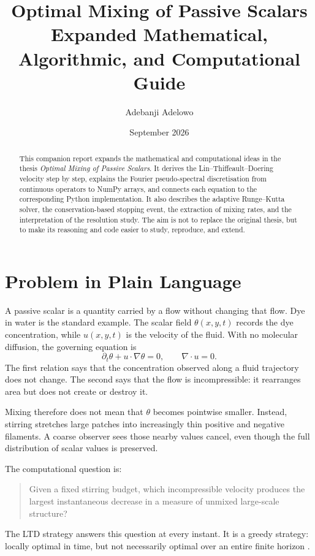 \documentclass[12pt,a4paper]{article}
\title{\textbf{Optimal Mixing of Passive Scalars}\\[5pt]
\large Expanded Mathematical, Algorithmic, and Computational Guide}
\author{Adebanji Adelowo}
\date{September 2026}
\theoremstyle{definition}
\begin{document}
\maketitle

\begin{abstract}
This companion report expands the mathematical and computational ideas in
the thesis \emph{Optimal Mixing of Passive Scalars}. It derives the
Lin--Thiffeault--Doering velocity step by step, explains the Fourier
pseudo-spectral discretisation from continuous operators to NumPy arrays,
and connects each equation to the corresponding Python implementation. It
also describes the adaptive Runge--Kutta solver, the conservation-based
stopping event, the extraction of mixing rates, and the interpretation of
the resolution study. The aim is not to replace the original thesis, but to
make its reasoning and code easier to study, reproduce, and extend.
\end{abstract}

\tableofcontents
\clearpage

\section{Problem in Plain Language}

A passive scalar is a quantity carried by a flow without changing that
flow. Dye in water is the standard example. The scalar field
$\theta(x,y,t)$ records the dye concentration, while $u(x,y,t)$ is the
velocity of the fluid. With no molecular diffusion, the governing equation
is
\begin{equation}
  \partial_t\theta+u\cdot\nabla\theta=0,
  \qquad \nabla\cdot u=0.
  \label{eq:transport}
\end{equation}
The first relation says that the concentration observed along a fluid
trajectory does not change. The second says that the flow is
incompressible: it rearranges area but does not create or destroy it.

Mixing therefore does not mean that $\theta$ becomes pointwise smaller.
Instead, stirring stretches large patches into increasingly thin positive
and negative filaments. A coarse observer sees those nearby values cancel,
even though the full distribution of scalar values is preserved.

The computational question is:
\begin{quote}
Given a fixed stirring budget, which incompressible velocity produces the
largest instantaneous decrease in a measure of unmixed large-scale
structure?
\end{quote}
The LTD strategy answers this question at every instant. It is a greedy
strategy: locally optimal in time, but not necessarily optimal over an
entire finite horizon \cite{LTD2011}.
\end{document}
